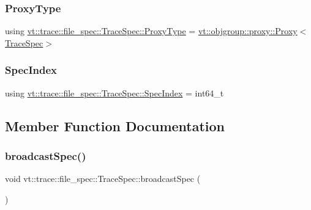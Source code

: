 \subsubsection{\texorpdfstring{Proxy\+Type}{ProxyType}}
{\footnotesize\ttfamily using \hyperlink{structvt_1_1trace_1_1file__spec_1_1_trace_spec_a26160cff9bb5115866943ed823405f1f}{vt\+::trace\+::file\+\_\+spec\+::\+Trace\+Spec\+::\+Proxy\+Type} =  \hyperlink{structvt_1_1objgroup_1_1proxy_1_1_proxy}{vt\+::objgroup\+::proxy\+::\+Proxy}$<$\hyperlink{structvt_1_1trace_1_1file__spec_1_1_trace_spec}{Trace\+Spec}$>$}

\mbox{\label{structvt_1_1trace_1_1file__spec_1_1_trace_spec_a4dd2e8fb971930351812d0f286baece2}} 
\subsubsection{\texorpdfstring{Spec\+Index}{SpecIndex}}
{\footnotesize\ttfamily using \hyperlink{structvt_1_1trace_1_1file__spec_1_1_trace_spec_a4dd2e8fb971930351812d0f286baece2}{vt\+::trace\+::file\+\_\+spec\+::\+Trace\+Spec\+::\+Spec\+Index} =  int64\+\_\+t}



\subsection{Member Function Documentation}
\mbox{\label{structvt_1_1trace_1_1file__spec_1_1_trace_spec_a3a5ececf49f827a057a7bea8ac7e7584}} 
\subsubsection{\texorpdfstring{broadcast\+Spec()}{broadcastSpec()}}
{\footnotesize\ttfamily void vt\+::trace\+::file\+\_\+spec\+::\+Trace\+Spec\+::broadcast\+Spec (\begin{DoxyParamCaption}{ }\end{DoxyParamCaption})}



